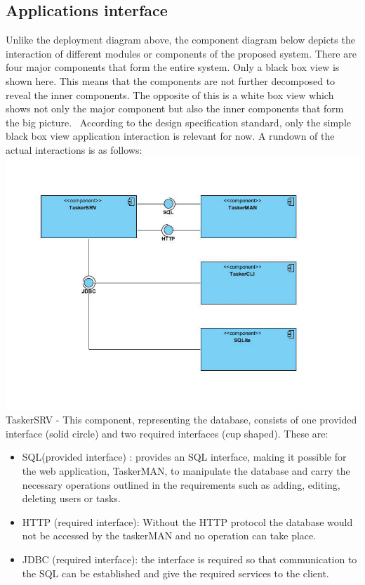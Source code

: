\documentclass{project}
\begin{document}
\subsection{Applications interface}
Unlike the deployment diagram above, the component diagram below depicts the interaction of different modules or components of the proposed system. There are four major components that form the entire system. Only a black box view is shown here. This means that the components are not further decomposed to reveal the inner components. The opposite of this is a white box view which shows not only the major component but also the inner components that form the big picture.  
According to the design specification standard, only the simple black box view application interaction is relevant for now. A rundown of the actual interactions is as follows: \\
\includegraphics[width=\textwidth]{images/4.2/ApplicationsInterface} 
TaskerSRV - This component, representing the database, consists of one provided interface (solid circle) and two required interfaces (cup shaped). These are:
\begin{itemize}
	\item SQL(provided interface) : provides an SQL interface, making it possible for the web application, TaskerMAN, to manipulate the database and carry the necessary operations outlined in the requirements such as adding, editing, deleting users or tasks. 
	\item HTTP (required interface): Without the HTTP protocol the database would not be accessed by the taskerMAN and no operation can take place.
	\item JDBC (required interface): the interface is required so that communication to the SQL can be established and give the required services to the client.
\end{itemize}
\end{document}
